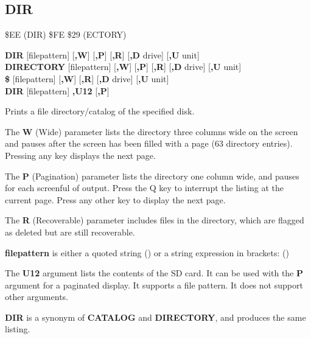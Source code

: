 
\newpage
\subsection{DIR}
\begin{description}[leftmargin=2cm,style=nextline]
\item [Token:]    \$EE (DIR) \$FE \$29 (ECTORY)

\item [Format:]   {\bf DIR} [filepattern] [{\bf,W}] [{\bf,P}] [{\bf,R}] [{\bf,D} drive] [{\bf,U} unit] \\
		            {\bf DIRECTORY} [filepattern] [{\bf,W}] [{\bf,P}] [{\bf,R}] [{\bf,D} drive] [{\bf,U} unit] \\
		            {\bf \$} [filepattern] [{\bf,W}] [{\bf,R}] [{\bf,D} drive] [{\bf,U} unit] \\
                  {\bf DIR} [filepattern] {\bf,U12} [{\bf,P}]

\item [Usage:]    Prints a file directory/catalog of the specified disk.

                  The {\bf W} (Wide) parameter lists the directory three columns wide on the screen and pauses after the screen has been filled with a page (63 directory entries). Pressing any key displays the next page.

                  The {\bf P} (Pagination) parameter lists the directory one column wide, and pauses for each screenful of output. Press the Q key to interrupt the listing at the current page. Press any other key to display the next page.

                  The {\bf R} (Recoverable) parameter includes files in the directory, which are flagged as deleted but are still recoverable.

                  {\bf filepattern} is either a quoted string () or a string expression in brackets: ()

                  The {\bf U12} argument lists the contents of the SD card. It can be used with the {\bf P} argument for a paginated display. It supports a file pattern. It does not support other arguments.

                  \drivedefinition

                  \unitdefinition

\item [Remarks:]  {\bf DIR} is a synonym of {\bf CATALOG} and {\bf DIRECTORY}, and produces the same listing.


\end{description}
